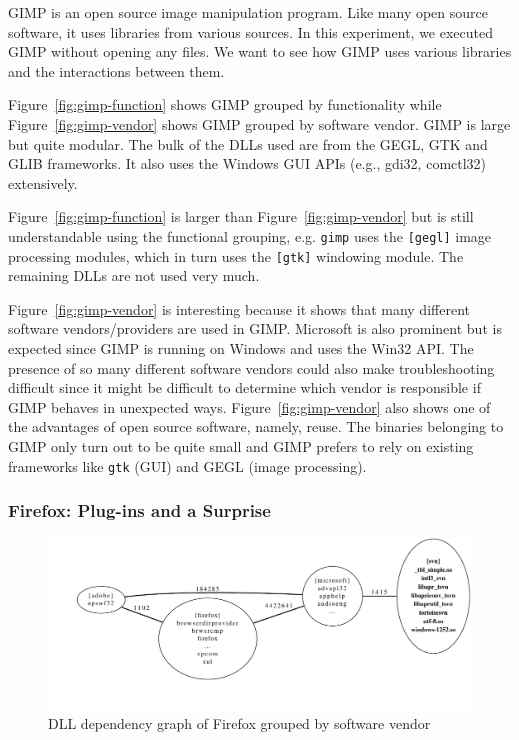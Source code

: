 GIMP is an open source image manipulation program. Like many open source
software, it uses libraries from various sources. In this experiment, we
executed GIMP without opening any files. We want to see how GIMP uses various
libraries and the interactions between them.

Figure~\ref{fig:gimp-function} shows GIMP grouped by functionality while
Figure~\ref{fig:gimp-vendor} shows
GIMP grouped by software vendor.
GIMP is large but quite modular. The bulk of
the DLLs used are from the GEGL, GTK and GLIB frameworks. It also uses the
Windows GUI APIs (e.g., gdi32, comctl32) extensively.

Figure~\ref{fig:gimp-function} is larger than Figure~\ref{fig:gimp-vendor}
but is still understandable using the functional grouping,
e.g. {\tt gimp} uses the {\tt [gegl]}
image processing modules, which in turn uses the {\tt [gtk]} windowing
module.  The remaining DLLs are not used very much.

Figure~\ref{fig:gimp-vendor} is interesting because it shows that
many different software vendors/providers are used in GIMP.
Microsoft is also prominent but is
expected since GIMP is running on Windows and uses the Win32 API.
The presence of so many different software vendors could also make
troubleshooting difficult since it might be difficult to determine
which vendor is responsible if GIMP behaves in unexpected ways.
Figure~\ref{fig:gimp-vendor} also shows
one of the advantages of open source software, namely, reuse. The
binaries belonging to GIMP only turn out to be quite small and
GIMP prefers to rely on
existing frameworks like {\tt gtk} (GUI) and GEGL (image processing).

\subsubsection{Firefox: Plug-ins and a Surprise}

\begin{figure}
\centering
\includegraphics[width=1.0\columnwidth]{depvis/firefox-vendor.pdf}
\caption{DLL dependency graph of Firefox grouped by software vendor}
\label{fig:firefox}
\end{figure}

